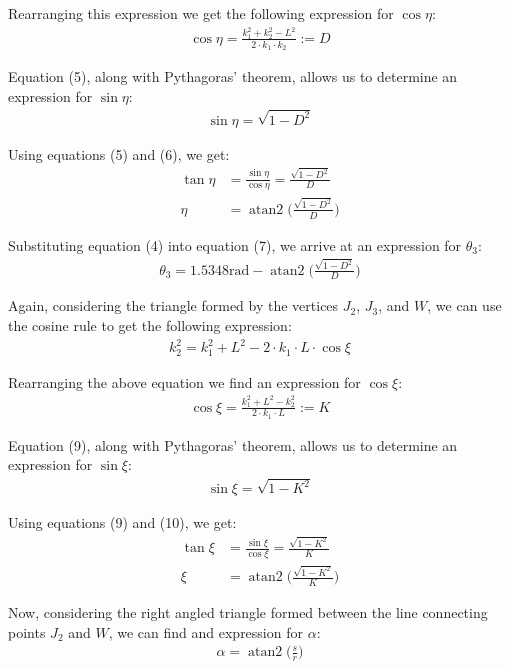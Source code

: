 \documentclass[a4paper]{article}
\DeclareMathOperator{\atantwo}{atan2}
\begin{document}
Rearranging this expression we get the following expression for $\cos \eta$:
\begin{align}
\cos \eta = \frac{k_1^2 + k_2^2 - L^2}{2 \cdot k_1 \cdot k_2} := D
\end{align}

Equation (5), along with Pythagoras' theorem, allows us to determine an expression for $\sin \eta$:
\begin{align}
\sin \eta = \sqrt{1 - D^2}
\end{align}

Using equations (5) and (6), we get:
\begin{align}
\tan \eta &= \frac{\sin \eta}{\cos \eta} = \frac{\sqrt{1 - D^2}}{D} \nonumber\\
\eta &= \atantwo \bigg(\frac{\sqrt{1-D^2}}{D}\bigg)
\end{align}

Substituting equation (4) into equation (7), we arrive at an expression for $\theta_3$:
\begin{align}
\theta_3 = 1.5348\si{\radian} - \atantwo \bigg(\frac{\sqrt{1 - D^2}}{D}\bigg)
\end{align}

Again, considering the triangle formed by the vertices $J_2$, $J_3$, and $W$, we can use the cosine rule to get the following expression:
\begin{align*}
k_2^2 = k_1^2 + L^2 - 2 \cdot k_1 \cdot L \cdot \cos \xi
\end{align*}

Rearranging the above equation we find an expression for $\cos \xi$:
\begin{align}
\cos \xi = \frac{k_1^2 + L^2 - k_2^2}{2 \cdot k_1 \cdot L} := K
\end{align}

Equation (9), along with Pythagoras' theorem, allows us to determine an expression for $\sin \xi$:
\begin{align}
\sin \xi = \sqrt{1 - K^2}
\end{align}

Using equations (9) and (10), we get:
\begin{align}
\tan \xi &= \frac{\sin \xi}{\cos \xi} = \frac{\sqrt{1 - K^2}}{K} \nonumber\\
\xi &= \atantwo \bigg(\frac{\sqrt{1-K^2}}{K}\bigg)
\end{align}

Now, considering the right angled triangle formed between the line connecting points $J_2$ and $W$, we can find and expression for $\alpha$:
\begin{align}
\alpha = \atantwo \bigg(\frac{s}{r}\bigg)
\end{align}
\end{document}
